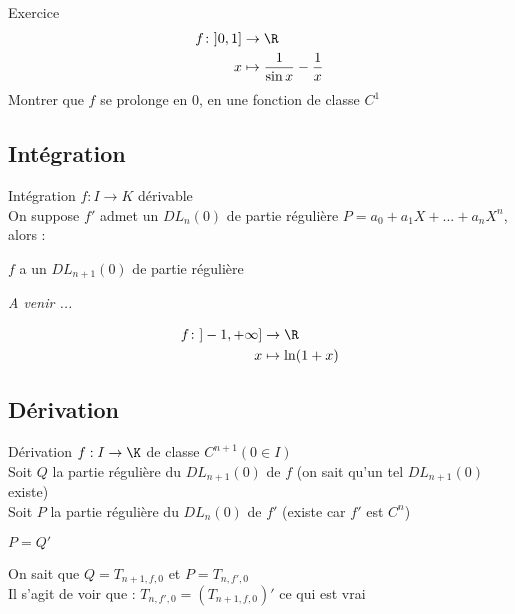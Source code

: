 \documentclass[12pt,a4paper]{report}
\begin{document}
\begin{application}{Exercice}{}
\begin{align*}
  f \colon ]0,1] &\to \R\\
  x &\mapsto \dfrac{1}{\sin x} - \dfrac{1}{x}
\end{align*}
Montrer que $f$ se prolonge en 0, en une fonction de classe $C^1$
\end{application}

\subsection{Intégration}
\begin{proposition}{Intégration}{}
$f:I \to K$ dérivable\\
On suppose $f'$ admet un $DL_n (0)$ de partie régulière $P=a_0 +a_1 X + ... + a_n X^n$, alors :
\begin{center}
    $f$ a un $DL_{n+1} (0)$ de partie régulière 
\end{center}
\end{proposition}

\begin{demo}
\textit{A venir ...}
\end{demo}

\begin{application}{}{}
\begin{align*}
  f \colon ]-1,+\infty] &\to \R\\
  x &\mapsto \ln (1+x)
\end{align*}
\end{application}

\subsection{Dérivation}
\begin{proposition}{Dérivation}{}
$f:I \to \K$ de classe $C^{n+1} (0 \in I)$\\
Soit $Q$ la partie régulière du $DL_{n+1} (0)$ de $f$ (on sait qu'un tel $DL_{n+1} (0)$ existe)\\
Soit $P$ la partie régulière du $DL_{n} (0)$ de $f'$ (existe car $f'$ est $C^n$)
\begin{center}
    $P=Q'$
\end{center}
\end{proposition}

\begin{demo}
On sait que $Q=T_{n+1,f,0}$ et $P=T_{n,f',0}$\\
Il s'agit de voir que : $T_{n,f',0}= (T_{n+1,f,0})'$ ce qui est vrai
\end{demo}
\end{document}
